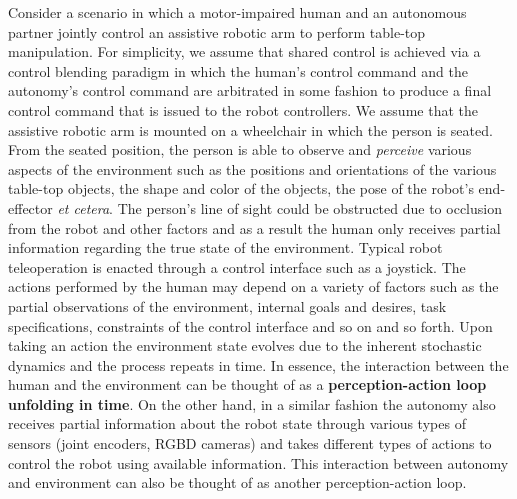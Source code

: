 \documentclass[12pt]{article}
\begin{document}
Consider a scenario in which a motor-impaired human and an autonomous partner jointly control an assistive robotic arm to perform table-top manipulation. For simplicity, we assume that shared control is achieved via a control blending paradigm in which the human's control command and the autonomy's control command are arbitrated in some fashion to produce a final control command that is issued to the robot controllers. We assume that the assistive robotic arm is mounted on a wheelchair in which the person is seated. From the seated position, the person is able to observe and \textit{perceive} various aspects of the environment such as the positions and orientations of the various table-top objects, the shape and color of the objects, the pose of the robot's end-effector \textit{et cetera}. The person's line of sight could be obstructed due to occlusion from the robot and other factors and as a result the human only receives partial information regarding the true state of the environment. Typical robot teleoperation is enacted through a control interface such as a joystick. The actions performed by the human may depend on a variety of factors such as the partial observations of the environment, internal goals and desires, task specifications, constraints of the control interface and so on and so forth. Upon taking an action the environment state evolves due to the inherent stochastic dynamics and the process repeats in time. In essence, the interaction between the human and the environment can be thought of as a \textbf{perception-action loop unfolding in time}. On the other hand, in a similar fashion the autonomy also receives partial information about the robot state through various types of sensors (joint encoders, RGBD cameras) and takes different types of actions to control the robot using available information. This interaction between autonomy and environment can also be thought of as another perception-action loop. 
\end{document}
